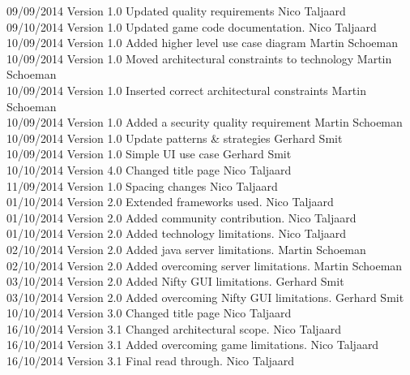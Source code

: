 \documentclass[letterpaper]{article}
\begin{document}
\begin{tabbing}
			09/09/2014	\> Version 1.0	\> Updated quality requirements					\> Nico Taljaard \\
			09/10/2014	\> Version 1.0	\> Updated game code documentation.				\> Nico Taljaard\\
			10/09/2014 	\> Version 1.0  \> Added higher level use case diagram			\> Martin Schoeman\\
			10/09/2014  \> Version 1.0	\> Moved architectural constraints to technology\> Martin Schoeman\\
			10/09/2014  \> Version 1.0  \> Inserted correct architectural constraints	\> Martin Schoeman\\
			10/09/2014	\> Version 1.0  \> Added a security quality requirement			\> Martin Schoeman\\
			10/09/2014	\> Version 1.0	\> Update patterns \& strategies				\> Gerhard Smit \\
			10/09/2014	\> Version 1.0	\> Simple UI use case							\> Gerhard Smit \\
			10/10/2014	\> Version 4.0	\> Changed title page							\> Nico Taljaard\\
			11/09/2014	\> Version 1.0	\> Spacing changes								\> Nico Taljaard \\
			01/10/2014	\> Version 2.0	\> Extended frameworks used.					\> Nico Taljaard \\
			01/10/2014	\> Version 2.0	\> Added community contribution.				\> Nico Taljaard \\
			01/10/2014	\> Version 2.0	\> Added technology limitations.				\> Nico Taljaard \\
			02/10/2014	\> Version 2.0	\> Added java server limitations.				\> Martin Schoeman\\
			02/10/2014	\> Version 2.0	\> Added overcoming server limitations.			\> Martin Schoeman\\
			03/10/2014	\> Version 2.0	\> Added Nifty GUI limitations.					\> Gerhard Smit\\
			03/10/2014	\> Version 2.0	\> Added overcoming Nifty GUI limitations.		\> Gerhard Smit\\
			10/10/2014	\> Version 3.0	\> Changed title page							\> Nico Taljaard\\
			16/10/2014	\> Version 3.1	\> Changed architectural scope.					\> Nico Taljaard\\
			16/10/2014	\> Version 3.1	\> Added overcoming game limitations.			\> Nico Taljaard\\
			16/10/2014	\> Version 3.1	\> Final read through.							\> Nico Taljaard\\
		\end{tabbing}
		
\end{document}
